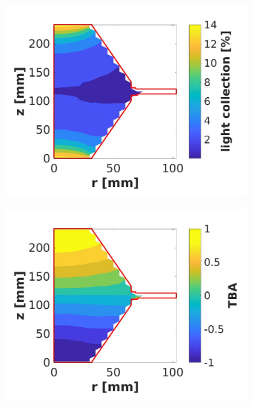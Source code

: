 \begin{figure}[!p]
	\centering
	\begin{subfigure}[b]{\halfwidth}
		\centering
		\includegraphics[width=\textwidth,clip,trim={0 0 0 0}]{Figures/GasTest/LGresult/PDEvsCrossSectionTotPTFE040.jpg}
		\caption{}
		\label{fig:}
	\end{subfigure}
	\begin{subfigure}[b]{\halfwidth}
		\centering
		\includegraphics[width=\textwidth,clip,trim={0 0 0 0}]{Figures/GasTest/LGresult/PDEvsCrossSectionTBAPTFE040.jpg}
		\caption{}
		\label{fig:}
	\end{subfigure}
	\begin{subfigure}[b]{\halfwidth}

\end{subfigure}
\end{figure}
